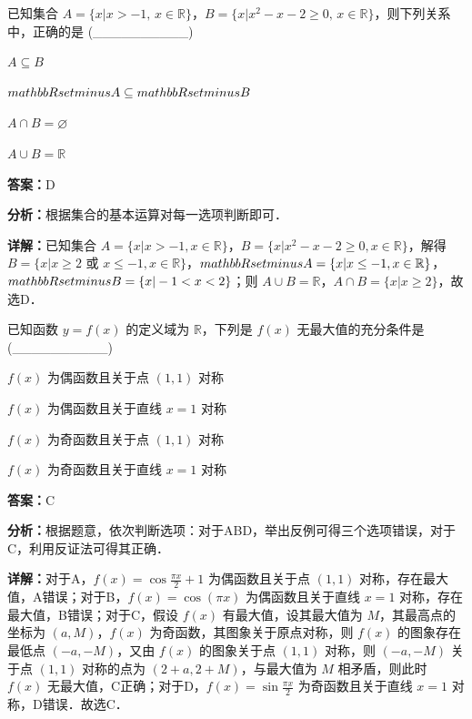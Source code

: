 \begin{question}[points=5]
已知集合 $A=\{x|x>-1,\,x\in\mathbb{R}\}$，$B=\{x|x^2-x-2\ge 0,\,x\in\mathbb{R}\}$，则下列关系中，正确的是 (\_\_\_\_\_\_\_\_\_\_)
\begin{choices}
  \item $A\subseteq B$
  \item $\\mathbb{R}\\setminus A\subseteq\\mathbb{R}\\setminus B$
  \item $A\cap B=\varnothing$
  \item $A\cup B=\mathbb{R}$
\end{choices}
\begin{solution}
\textbf{答案：}D

\textbf{分析：}根据集合的基本运算对每一选项判断即可．

\textbf{详解：}已知集合 $A=\{x|x>-1,x\in\mathbb{R}\}$，$B=\{x|x^2-x-2\ge 0,x\in\mathbb{R}\}$，解得 $B=\{x|x\ge 2\text{ 或 }x\le -1,x\in\mathbb{R}\}$，$\\mathbb{R}\\setminus A=\{x|x\le -1,x\in\mathbb{R}\}$，$\\mathbb{R}\\setminus B=\{x|-1<x<2\}$；则 $A\cup B=\mathbb{R}$，$A\cap B=\{x|x\ge 2\}$，故选D．
\end{solution}
\end{question}

\begin{question}[points=5]
已知函数 $y=f(x)$ 的定义域为 $\mathbb{R}$，下列是 $f(x)$ 无最大值的充分条件是 (\_\_\_\_\_\_\_\_\_\_)
\begin{choices}
  \item $f(x)$ 为偶函数且关于点 $(1,1)$ 对称
  \item $f(x)$ 为偶函数且关于直线 $x=1$ 对称
  \item $f(x)$ 为奇函数且关于点 $(1,1)$ 对称
  \item $f(x)$ 为奇函数且关于直线 $x=1$ 对称
\end{choices}
\begin{solution}
\textbf{答案：}C

\textbf{分析：}根据题意，依次判断选项：对于ABD，举出反例可得三个选项错误，对于C，利用反证法可得其正确．

\textbf{详解：}对于A，$f(x)=\cos\frac{\pi x}{2}+1$ 为偶函数且关于点 $(1,1)$ 对称，存在最大值，A错误；对于B，$f(x)=\cos(\pi x)$ 为偶函数且关于直线 $x=1$ 对称，存在最大值，B错误；对于C，假设 $f(x)$ 有最大值，设其最大值为 $M$，其最高点的坐标为 $(a,M)$，$f(x)$ 为奇函数，其图象关于原点对称，则 $f(x)$ 的图象存在最低点 $(-a,-M)$，又由 $f(x)$ 的图象关于点 $(1,1)$ 对称，则 $(-a,-M)$ 关于点 $(1,1)$ 对称的点为 $(2+a,2+M)$，与最大值为 $M$ 相矛盾，则此时 $f(x)$ 无最大值，C正确；对于D，$f(x)=\sin\frac{\pi x}{2}$ 为奇函数且关于直线 $x=1$ 对称，D错误．故选C．
\end{solution}
\end{question}


